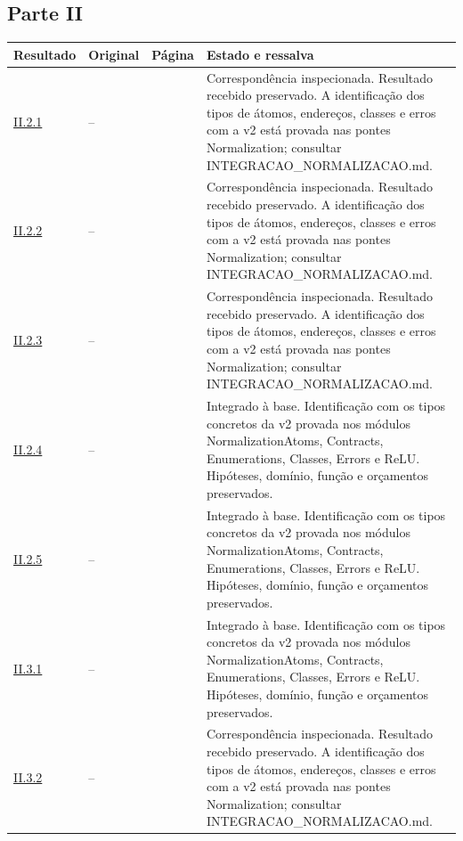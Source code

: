 \subsection*{Parte II}
\small
\begin{longtable}{@{}p{.11\linewidth}p{.09\linewidth}p{.09\linewidth}p{.59\linewidth}@{}}
\toprule Resultado & Original & Página & Estado e ressalva\\\midrule\endhead
\hyperref[map:normalizacao:2.1]{II.2.1} & -- & \pageref{map:normalizacao:2.1} & Correspondência inspecionada. Resultado recebido preservado. A identificação dos tipos de átomos, endereços, classes e erros com a v2 está provada nas pontes Normalization; consultar INTEGRACAO\_NORMALIZACAO.md.\\[4pt]
\hyperref[map:normalizacao:2.2]{II.2.2} & -- & \pageref{map:normalizacao:2.2} & Correspondência inspecionada. Resultado recebido preservado. A identificação dos tipos de átomos, endereços, classes e erros com a v2 está provada nas pontes Normalization; consultar INTEGRACAO\_NORMALIZACAO.md.\\[4pt]
\hyperref[map:normalizacao:2.3]{II.2.3} & -- & \pageref{map:normalizacao:2.3} & Correspondência inspecionada. Resultado recebido preservado. A identificação dos tipos de átomos, endereços, classes e erros com a v2 está provada nas pontes Normalization; consultar INTEGRACAO\_NORMALIZACAO.md.\\[4pt]
\hyperref[map:normalizacao:2.4]{II.2.4} & -- & \pageref{map:normalizacao:2.4} & Integrado à base. Identificação com os tipos concretos da v2 provada nos módulos NormalizationAtoms, Contracts, Enumerations, Classes, Errors e ReLU. Hipóteses, domínio, função e orçamentos preservados.\\[4pt]
\hyperref[map:normalizacao:2.5]{II.2.5} & -- & \pageref{map:normalizacao:2.5} & Integrado à base. Identificação com os tipos concretos da v2 provada nos módulos NormalizationAtoms, Contracts, Enumerations, Classes, Errors e ReLU. Hipóteses, domínio, função e orçamentos preservados.\\[4pt]
\hyperref[map:normalizacao:3.1]{II.3.1} & -- & \pageref{map:normalizacao:3.1} & Integrado à base. Identificação com os tipos concretos da v2 provada nos módulos NormalizationAtoms, Contracts, Enumerations, Classes, Errors e ReLU. Hipóteses, domínio, função e orçamentos preservados.\\[4pt]
\hyperref[map:normalizacao:3.2]{II.3.2} & -- & \pageref{map:normalizacao:3.2} & Correspondência inspecionada. Resultado recebido preservado. A identificação dos tipos de átomos, endereços, classes e erros com a v2 está provada nas pontes Normalization; consultar INTEGRACAO\_NORMALIZACAO.md.\\[4pt]

\end{longtable}
